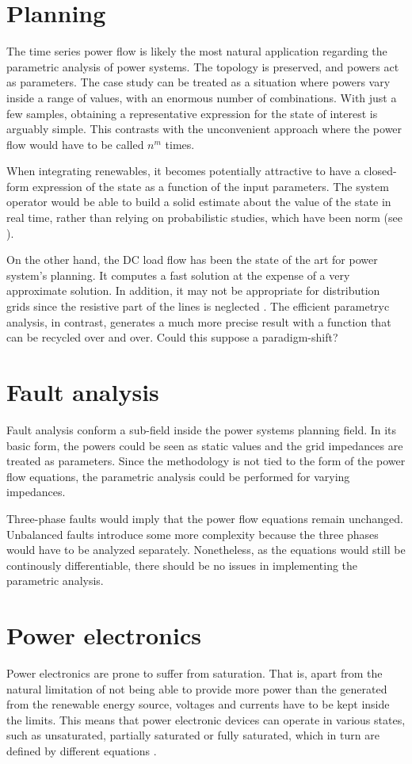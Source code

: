 
\section{Planning}
The time series power flow is likely the most natural application regarding the parametric analysis of power systems. The topology is preserved, and powers act as parameters. The case study can be treated as a situation where powers vary inside a range of values, with an enormous number of combinations. With just a few samples, obtaining a representative expression for the state of interest is arguably simple. This contrasts with the unconvenient approach where the power flow would have to be called $n^m$ times. 

When integrating renewables, it becomes potentially attractive to have a closed-form expression of the state as a function of the input parameters. The system operator would be able to build a solid estimate about the value of the state in real time, rather than relying on probabilistic studies, which have been norm (see \cite{morales2010, fan2012, boehme2007}). 

On the other hand, the DC load flow has been the state of the art for power system's planning. It computes a fast solution at the expense of a very approximate solution. In addition, it may not be appropriate for distribution grids since the resistive part of the lines is neglected \cite{seifi2011}. The efficient parametryc analysis, in contrast, generates a much more precise result with a function that can be recycled over and over. Could this suppose a paradigm-shift?

\section{Fault analysis}
Fault analysis conform a sub-field inside the power systems planning field. In its basic form, the powers could be seen as static values and the grid impedances are treated as parameters. Since the methodology is not tied to the form of the power flow equations, the parametric analysis could be performed for varying impedances. 

Three-phase faults would imply that the power flow equations remain unchanged. Unbalanced faults introduce some more complexity because the three phases would have to be analyzed separately. Nonetheless, as the equations would still be continously differentiable, there should be no issues in implementing the parametric analysis. 

\section{Power electronics}
Power electronics are prone to suffer from saturation. That is, apart from the natural limitation of not being able to provide more power than the generated from the renewable energy source, voltages and currents have to be kept inside the limits. This means that power electronic devices can operate in various states, such as unsaturated, partially saturated or fully saturated, which in turn are defined by different equations \cite{song2021}. 

